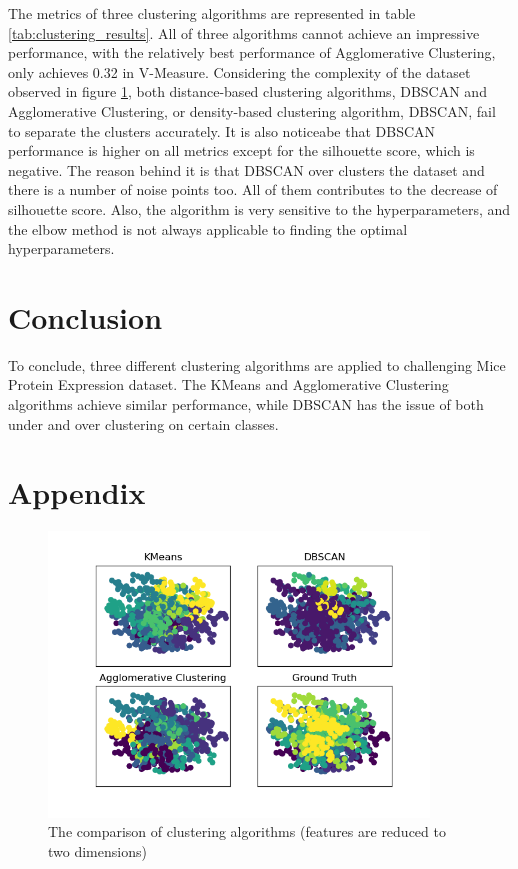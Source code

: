 \documentclass[12pt,a4paper]{article}
\begin{document}
The metrics of three clustering algorithms are represented in table \ref{tab:clustering_results}. 
All of three algorithms cannot achieve an impressive performance, with the relatively best performance of Agglomerative Clustering, only achieves 0.32 in V-Measure. 
Considering the complexity of the dataset observed in figure \ref{fig:comparison_clustering}, both distance-based clustering algorithms, DBSCAN and Agglomerative Clustering, or density-based clustering algorithm, DBSCAN, fail to separate the clusters accurately. 
It is also noticeabe that DBSCAN performance is higher on all metrics except for the silhouette score, which is negative. 
The reason behind it is that DBSCAN over clusters the dataset and there is a number of noise points too. All of them contributes to the decrease of silhouette score. 
Also, the algorithm is very sensitive to the hyperparameters, and the elbow method is not always applicable to finding the optimal hyperparameters.

\section{Conclusion}\label{sec:conclusion}
To conclude, three different clustering algorithms are applied to challenging Mice Protein Expression dataset. 
The KMeans and Agglomerative Clustering algorithms achieve similar performance, while DBSCAN has the issue of both under and over clustering on certain classes. 


\printbibliography


\section{Appendix}\label{sec:appendix}
\begin{figure}[H]
    \centering
    \includegraphics[width=0.9\textwidth]{figures/clustering_result_comparison.png}
    \caption{The comparison of clustering algorithms (features are reduced to two dimensions)}
    \label{fig:comparison_clustering}
\end{figure}
\end{document}
